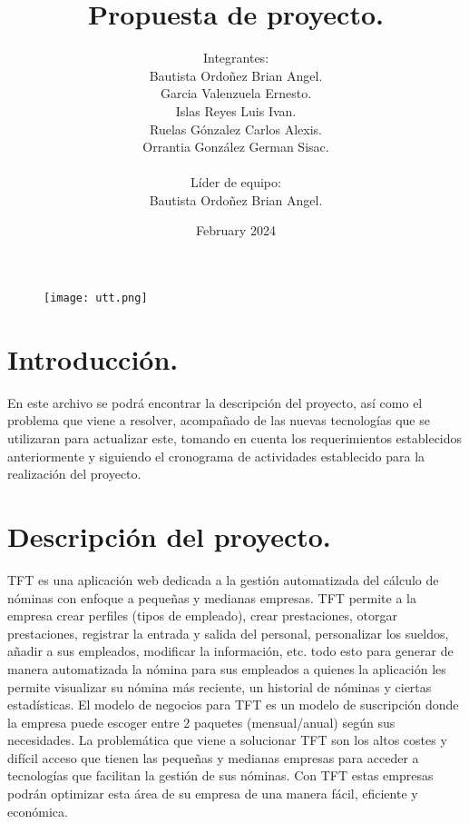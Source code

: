 \documentclass{article}
\title{Propuesta de proyecto.}
\author{Integrantes: \\
Bautista Ordoñez Brian Angel. \\
Garcia Valenzuela Ernesto. \\
Islas Reyes Luis Ivan. \\
Ruelas Gónzalez Carlos Alexis. \\
Orrantia González German Sisac. \\ \\
Líder de equipo: \\
Bautista Ordoñez Brian Angel.}
\date{February 2024}
\begin{document}
\begin{figure}
    \centering
    \texttt{[image: utt.png]}
    \label{fig:enter-label}
\end{figure}


\maketitle




\renewcommand{\indexname}{Índice} %
\printindex

\newpage
\section{Introducción.}
En este archivo se podrá encontrar la descripción del proyecto, así como el problema que viene a resolver, acompañado de las nuevas tecnologías que se utilizaran para actualizar este, tomando en cuenta los requerimientos establecidos anteriormente y siguiendo el cronograma de actividades establecido para la realización del proyecto. \\

\section{Descripción del proyecto.}
TFT es una aplicación web dedicada a la gestión automatizada del cálculo de nóminas con enfoque a pequeñas y medianas empresas. TFT permite a la empresa crear perfiles (tipos de empleado), crear prestaciones, otorgar prestaciones, registrar la entrada y salida del personal, personalizar los sueldos, añadir a sus empleados, modificar la información, etc. todo esto para generar de manera automatizada la nómina para sus empleados a quienes la aplicación les permite visualizar su nómina más reciente, un historial de nóminas y ciertas estadísticas. El modelo de negocios para TFT es un modelo de suscripción donde la empresa puede escoger entre 2 paquetes (mensual/anual) según sus necesidades.
La problemática que viene a solucionar TFT son los altos costes y difícil acceso que tienen las pequeñas y medianas empresas para acceder a tecnologías que facilitan la gestión de sus nóminas. Con TFT estas empresas podrán optimizar esta área de su empresa de una manera fácil, eficiente y económica.
\end{document}
